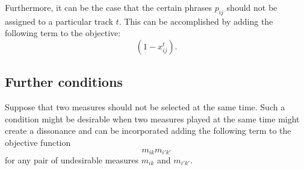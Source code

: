 \documentclass[11pt,a4paper]{article}
\begin{document}
 Furthermore, it can be the case that the certain phrases $ p_{ij} $ should not be assigned to a particular track $ t $. This can be accomplished by adding the following term to the objective:
 \begin{equation}
 (1-x_{ij}^t).
 \end{equation} 
 
 \subsection{Further conditions}
 Suppose that two measures should not be selected at the same time. Such a condition might be desirable when two measures played at the same time might create a dissonance and can be incorporated adding the following term to the objective function
 \begin{equation}
 m_{ik}m_{i'k'}
 \end{equation}  
for any pair of undesirable measures $m_{ik}$ and $ m_{i'k'} $. 



\end{document}
